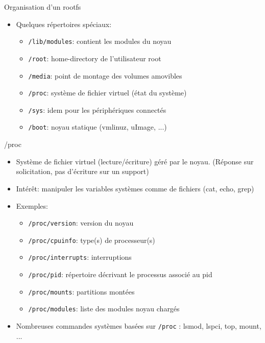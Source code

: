 \begin{frame}{Organisation d'un rootfs}
  \begin{itemize}
  \item Quelques répertoires spéciaux:
    \begin{itemize}
    \item \texttt{/lib/modules}: contient les modules du noyau
    \item \texttt{/root}: home-directory de l'utilisateur root
    \item \texttt{/media}: point de montage des volumes amovibles
    \item \texttt{/proc}: système de fichier virtuel (état du système)
    \item \texttt{/sys}: idem pour les périphériques connectés
    \item \texttt{/boot}: noyau statique (vmlinuz, uImage, ...)
    \end{itemize}
  \end{itemize}
\end{frame}

\begin{frame}{/proc}
  \begin{itemize}
  \item Système de fichier virtuel (lecture/écriture) géré par le noyau. (Réponse sur solicitation, pas d'écriture sur un support)
  \item Intérêt: manipuler les variables systèmes comme de fichiers (cat, echo, grep)
  \item Exemples:
    \begin{itemize}
    \item \texttt{/proc/version}: version du noyau
    \item \texttt{/proc/cpuinfo}: type(s) de processeur(s)
    \item \texttt{/proc/interrupts}: interruptions
    \item \texttt{/proc/pid}: répertoire décrivant le processus associé au pid
    \item \texttt{/proc/mounts}: partitions montées
    \item \texttt{/proc/modules}: liste des modules noyau chargés
    \end{itemize}
  \item Nombreuses commandes systèmes basées sur \texttt{/proc} : lsmod, lspci, top, mount, ...
  \end{itemize}
\end{frame}

